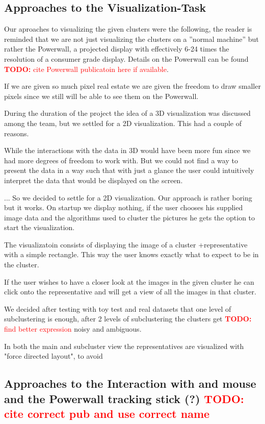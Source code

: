 \documentclass[journal]{vgtc}       %
\newcommand{\todo}[1]{\textcolor{red}{\textbf{TODO:} #1}}
\begin{document}
\subsection{Approaches to the Visualization-Task}

Our aproaches to visualizing the given clusters were the following, the reader is reminded that we are not just visualizing the clusters on a ''normal machine'' but rather the Powerwall, a projected display with effectively 6-24 times the resolution of a consumer grade display. Details on the Powerwall can be found \todo{cite Powerwall publicatoin here if available}. \cite{Powerwall}

If we are given so much pixel real estate we are given the freedom to draw smaller pixels since we still will be able to see them on the Powerwall.

During the duration of the project the idea of a 3D visualization was discussed among the team, but we settled for a 2D visualization. This had a couple of reasons.

While the interactions with the data in 3D would have been more fun since we had more degrees of freedom to work with.
But we could not find a way to present the data in a way such that with just a glance the user could intuitively interpret the data that would be displayed on the screen.

... So we decided to settle for a 2D visualization. Our approach is rather boring but it works. On startup we display nothing, if the user chooses his supplied image data and the algorithms used to cluster the pictures he gets the option to start the visualization.

The visualizatoin consists of displaying the image of a cluster +representative with a simple rectangle. 
This way the user knows exactly what to expect to be in the cluster.

If the user wishes to have a closer look at the images in the given cluster he can click onto the representative and will get a view of all the images in that cluster.

We decided after testing with toy test and real datasets that one level of subclustering is enough, after 2 levels of subclustering the clusters get \todo{find better expression}  noisy and ambiguous.

In both the main and subcluster view the representatives are visualized with "force directed layout", to avoid 

\subsection{Approaches to the Interaction with and mouse and the Powerwall tracking stick (?) \todo{cite correct pub and use correct name}}
\end{document}
